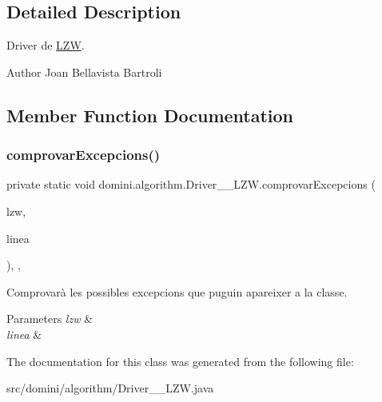 \subsection{Detailed Description}
Driver de \hyperlink{classdomini_1_1algorithm_1_1LZW}{L\+ZW}. 

\begin{DoxyAuthor}{Author}
Joan Bellavista Bartroli 
\end{DoxyAuthor}


\subsection{Member Function Documentation}
\mbox{\label{classdomini_1_1algorithm_1_1Driver____LZW_a3f609a2c3a22d0c7d11a5ff4e015e433}} 
\subsubsection{\texorpdfstring{comprovar\+Excepcions()}{comprovarExcepcions()}}
{\footnotesize\ttfamily private static void domini.\+algorithm.\+Driver\+\_\+\+\_\+\+L\+Z\+W.\+comprovar\+Excepcions (\begin{DoxyParamCaption}\item[{\hyperlink{classdomini_1_1algorithm_1_1LZW}{L\+ZW}}]{lzw,  }\item[{String}]{linea }\end{DoxyParamCaption})\hspace{0.3cm}{\ttfamily [inline]}, {\ttfamily [static]}, {\ttfamily [private]}}



Comprovarà les possibles excepcions que puguin apareixer a la classe. 


\begin{DoxyParams}{Parameters}
{\em lzw} & \\
\hline
{\em linea} & \\
\hline
\end{DoxyParams}


The documentation for this class was generated from the following file\+:\begin{DoxyCompactItemize}
\item 
src/domini/algorithm/Driver\+\_\+\+\_\+\+L\+Z\+W.\+java\end{DoxyCompactItemize}
